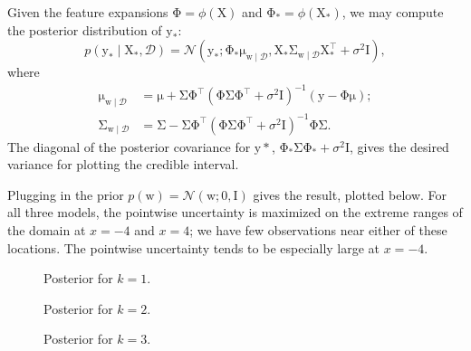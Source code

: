 \documentclass{article}
\newcommand{\given}{\mid}
\newcommand{\mc}[1]{\mathcal{#1}}
\newcommand{\data}{\mc{D}}
\newcommand{\mat}[1]{\bm{\mathrm{#1}}}
\renewcommand{\vec}[1]{\bm{\mathrm{#1}}}
\newcommand{\trans}{^\top}
\newcommand{\inv}{^{-1}}
\begin{document}
Given the feature expansions $\mat{\Phi} = \phi(\mat{X})$ and
$\mat{\Phi}_\ast = \phi(\mat{X}_\ast)$, we may compute the posterior
distribution of $\vec{y}_\ast$:
\begin{equation*}
  p(\vec{y}_\ast \given \vec{X}_\ast, \data)
  =
  \mc{N}(\vec{y}_\ast;
  \mat{\Phi}_\ast \vec{\mu}_{\vec{w}\given\data},
  \mat{X}_\ast \mat{\Sigma}_{\vec{w}\given\data} \mat{X}_\ast\trans + \sigma^2 \mat{I}),
\end{equation*}
where
\begin{align*}
  \vec{\mu}_{\vec{w}\given\data}
  &=
  \vec{\mu}
  +
  \mat{\Sigma}
  \mat{\Phi}\trans
  (\mat{\Phi}\mat{\Sigma}\mat{\Phi}\trans + \sigma^2 \mat{I})\inv
  (\vec{y} - \mat{\Phi}\vec{\mu});
  \\
  \mat{\Sigma}_{\vec{w}\given\data}
  &=
  \mat{\Sigma}
  -
  \mat{\Sigma}
  \mat{\Phi}\trans
  (\mat{\Phi}\mat{\Sigma}\mat{\Phi}\trans + \sigma^2 \mat{I})\inv
  \mat{\Phi}
  \mat{\Sigma}.
\end{align*}
The diagonal of the posterior covariance for $\vec{y}\ast$,
$\mat{\Phi}_\ast\mat{\Sigma}\mat{\Phi}_\ast + \sigma^2\mat{I}$,
gives the desired variance for plotting the credible interval.

Plugging in the prior $p(\vec{w}) = \mc{N}(\vec{w}; \vec{0}, \mat{I})$
gives the result, plotted below.  For all three models, the pointwise
uncertainty is maximized on the extreme ranges of the domain at $x =
-4$ and $x = 4$; we have few observations near either of these
locations.  The pointwise uncertainty tends to be especially large at
$x = -4$.

\begin{figure}
  \centering
  
  \caption{Posterior for $k = 1$.}
  \label{order_1_expansion}
\end{figure}

\begin{figure}
  \centering
  
  \caption{Posterior for $k = 2$.}
  \label{order_2_expansion}
\end{figure}

\begin{figure}
  \centering
  
  \caption{Posterior for $k = 3$.}
  \label{order_3_expansion}
\end{figure}
\end{document}
